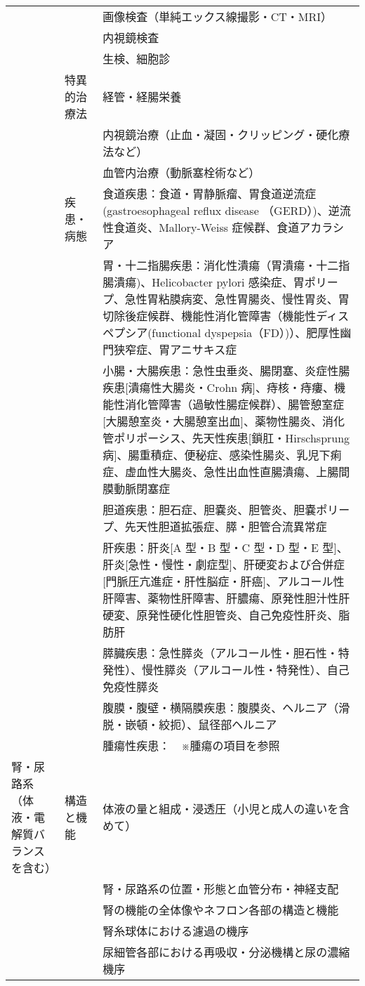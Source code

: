 \begin{xltabular}{\linewidth}{XXX}
 &  & 画像検査（単純エックス線撮影・CT・MRI） \\
 &  & 内視鏡検査 \\
 &  & 生検、細胞診 \\
 & 特異的治療法 & 経管・経腸栄養 \\
 &  & 内視鏡治療（止血・凝固・クリッピング・硬化療法など） \\
 &  & 血管内治療（動脈塞栓術など） \\
 & 疾患・病態 & 食道疾患：食道・胃静脈瘤、胃食道逆流症(gastroesophageal reflux disease （GERD）)、逆流性食道炎、Mallory-Weiss 症候群、食道アカラシア \\
 &  & 胃・十二指腸疾患：消化性潰瘍（胃潰瘍・十二指腸潰瘍)、Helicobacter pylori 感染症、胃ポリープ、急性胃粘膜病変、急性胃腸炎、慢性胃炎、胃切除後症候群、機能性消化管障害（機能性ディスペプシア(functional dyspepsia（FD）)）、肥厚性幽門狭窄症、胃アニサキス症 \\
 &  & 小腸・大腸疾患：急性虫垂炎、腸閉塞、炎症性腸疾患[潰瘍性大腸炎・Crohn 病]、痔核・痔瘻、機能性消化管障害（過敏性腸症候群）、腸管憩室症[大腸憩室炎・大腸憩室出血]、薬物性腸炎、消化管ポリポーシス、先天性疾患[鎖肛・Hirschsprung 病]、腸重積症、便秘症、感染性腸炎、乳児下痢症、虚血性大腸炎、急性出血性直腸潰瘍、上腸間膜動脈閉塞症 \\
 &  & 胆道疾患：胆石症、胆嚢炎、胆管炎、胆嚢ポリープ、先天性胆道拡張症、膵・胆管合流異常症 \\
 &  & 肝疾患：肝炎[A 型・B 型・C 型・D 型・E 型]、肝炎[急性・慢性・劇症型]、肝硬変および合併症[門脈圧亢進症・肝性脳症・肝癌]、アルコール性肝障害、薬物性肝障害、肝膿瘍、原発性胆汁性肝硬変、原発性硬化性胆管炎、自己免疫性肝炎、脂肪肝 \\
 &  & 膵臓疾患：急性膵炎（アルコール性・胆石性・特発性）、慢性膵炎（アルコール性・特発性）、自己免疫性膵炎 \\
 &  & 腹膜・腹壁・横隔膜疾患：腹膜炎、ヘルニア（滑脱・嵌頓・絞扼）、鼠径部ヘルニア \\
 &  & 腫瘍性疾患：　※腫瘍の項目を参照 \\
腎・尿路系（体液・電解質バランスを含む） & 構造と機能 & 体液の量と組成・浸透圧（小児と成人の違いを含めて） \\
 &  & 腎・尿路系の位置・形態と血管分布・神経支配 \\
 &  & 腎の機能の全体像やネフロン各部の構造と機能 \\
 &  & 腎糸球体における濾過の機序 \\
 &  & 尿細管各部における再吸収・分泌機構と尿の濃縮機序 \\

\end{xltabular}

